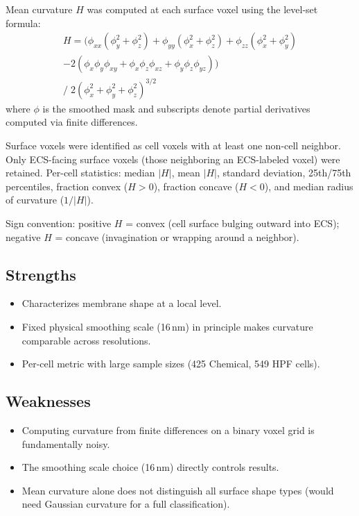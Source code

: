\documentclass[times, twoside]{zHenriquesLab-StyleBioRxiv}
\begin{document}
Mean curvature $H$ was computed at each surface voxel using the level-set formula:
\begin{multline*}
H = \Big(
\phi_{xx}(\phi_y^2 {+} \phi_z^2)
+ \phi_{yy}(\phi_x^2 {+} \phi_z^2)
+ \phi_{zz}(\phi_x^2 {+} \phi_y^2) \\
- 2(\phi_x\phi_y\phi_{xy}
{+} \phi_x\phi_z\phi_{xz}
{+} \phi_y\phi_z\phi_{yz})
\Big) \\
\Big/ \; 2(\phi_x^2 + \phi_y^2 + \phi_z^2)^{3/2}
\end{multline*}
where $\phi$ is the smoothed mask and subscripts denote partial derivatives computed via finite differences.

Surface voxels were identified as cell voxels with at least one non-cell neighbor. Only ECS-facing surface voxels (those neighboring an ECS-labeled voxel) were retained. Per-cell statistics: median $|H|$, mean $|H|$, standard deviation, 25th/75th percentiles, fraction convex ($H > 0$), fraction concave ($H < 0$), and median radius of curvature ($1/|H|$).

Sign convention: positive $H$ = convex (cell surface bulging outward into ECS); negative $H$ = concave (invagination or wrapping around a neighbor).

\subsection*{Strengths}
\begin{itemize}[nosep]
\item Characterizes membrane shape at a local level.
\item Fixed physical smoothing scale (16\,nm) in principle makes curvature comparable across resolutions.
\item Per-cell metric with large sample sizes (425 Chemical, 549 HPF cells).
\end{itemize}

\subsection*{Weaknesses}
\begin{itemize}[nosep]
\item Computing curvature from finite differences on a binary voxel grid is fundamentally noisy.
\item The smoothing scale choice (16\,nm) directly controls results.
\item Mean curvature alone does not distinguish all surface shape types (would need Gaussian curvature for a full classification).
\end{itemize}
\end{document}
